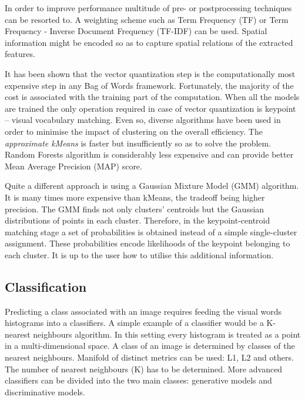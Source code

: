 \documentclass[a4paper,12pt]{article}
\begin{document}
	In order to improve performance multitude of pre- or postprocessing techniques can be resorted to. A weighting scheme such as Term Frequency (TF) or Term Frequency - Inverse Document Frequency (TF-IDF) can be used. Spatial information might be encoded so as to capture spatial relations of the extracted features.
	
	It has been shown that the vector quantization step is the computationally most expensive step in any Bag of Words framework. Fortunately, the majority of the cost is associated with the training part of the computation. When all the models are trained the only operation required in case of vector quantization is keypoint -- visual vocabulary matching. Even so, diverse algorithms have been used in order to minimise the impact of clustering on the overall efficiency. The \emph{approximate kMeans} is faster but insufficiently so as to solve the problem. Random Forests algorithm is considerably less expensive and can provide better Mean Average Precision (MAP) score.
	
	Quite a different approach is using a Gaussian Mixture Model (GMM) algorithm. It is many times more expensive than kMeans, the tradeoff being higher precision. The GMM finds not only clusters' centroids but the Gaussian distributions of points in each cluster. Therefore, in the keypoint-centroid matching stage a set of probabilities is obtained instead of a simple single-cluster assignment. These probabilities encode likelihoods of the keypoint belonging to each cluster. It is up to the user how to utilise this additional information.

\subsection{Classification}

	Predicting a class associated with an image requires feeding the visual words histograms into a classifiers. A simple example of a classifier would be a K-nearest neighbours algorithm. In this setting every histogram is treated as a point in a multi-dimensional space. A class of an image is determined by classes of the nearest neighbours. Manifold of distinct metrics can be used: L1, L2  and others. The number of nearest neighbours (K) has to be determined. More advanced classifiers can be divided into the two main classes: generative models and discriminative models.
	
\end{document}
